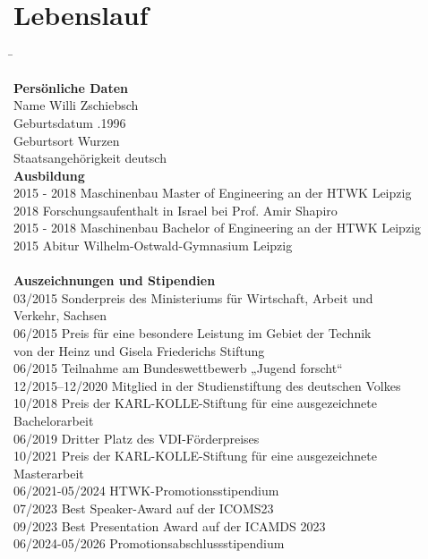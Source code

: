 \pagestyle{empty}
\section*{Lebenslauf}

\begin{tabbing}
\hspace*{4cm}\= \kill

\textbf{Persönliche Daten}\\[0.45em]%
Name							\>  Willi Zschiebsch	\\[0.45em]
Geburtsdatum					.1996			\\[0.45em]
Geburtsort						\> 	Wurzen  			\\[0.45em]
Staatsangehörigkeit		\> 		deutsch					\\[1.5em]

\textbf{Ausbildung} \\[0.45em]
2015 - 2018	\> Maschinenbau Master of Engineering an der HTWK Leipzig	\\[0.5em]	
2018	\> Forschungsaufenthalt in Israel bei Prof. Amir Shapiro 	\\[0.5em]
2015 - 2018	\> Maschinenbau Bachelor of Engineering an der HTWK Leipzig	\\[0.5em]
2015	\> Abitur Wilhelm-Ostwald-Gymnasium Leipzig	\\[0.5em]
															\\[1.5em]

\textbf{Auszeichnungen und Stipendien} \\[0.45em]
03/2015 \> Sonderpreis des Ministeriums für Wirtschaft, Arbeit und\\
		\>Verkehr, Sachsen\\[0.5em]
06/2015 \>  Preis für eine besondere Leistung im Gebiet der Technik\\
		\>  von der Heinz und Gisela Friederichs Stiftung \\[0.5em]
06/2015 \>  Teilnahme am Bundeswettbewerb „Jugend forscht“ \\[0.5em]
12/2015–12/2020 \>  Mitglied in der Studienstiftung des deutschen Volkes \\[0.5em]
10/2018 \> Preis der KARL-KOLLE-Stiftung für eine ausgezeichnete\\
		\> Bachelorarbeit\\[0.5em]
06/2019 \> Dritter Platz des VDI-Förderpreises \\[0.5em]
10/2021 \> Preis der KARL-KOLLE-Stiftung für eine ausgezeichnete\\
		\> Masterarbeit\\[0.5em]
06/2021-05/2024 \>  HTWK-Promotionsstipendium \\[0.5em]
07/2023 \> Best Speaker-Award auf der ICOMS23 \\[0.5em]
09/2023 \> Best Presentation Award auf der ICAMDS 2023 \\[0.5em]
06/2024-05/2026 \>  Promotionsabschlussstipendium\\
\end{tabbing}





